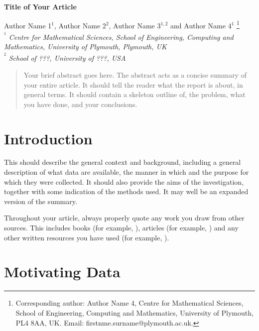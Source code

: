 \documentclass[a4paper,amsmath, 12pt]{article}
\begin{document}
\begin{center}
\textbf{\Large Title of Your Article}

\vspace{0.5cm}

Author Name 1$^{1}$, Author Name 2$^{2}$,  Author Name 3$^{1,2}$ and Author Name 4$^{1}$ \footnote[1]{Corresponding author: Author Name 4, Centre for Mathematical Sciences, School of Engineering, Computing and Mathematics, University of Plymouth, PL4 8AA, UK. Email: firstnme.surname@plymouth.ac.uk.} \\

{\it {\textsuperscript{$^{1}$} Centre for Mathematical Sciences,  School of Engineering, Computing and Mathematics, University of Plymouth, Plymouth, UK \\}}
{\it {\textsuperscript{$^{2}$} School of ???, University of ???, USA}}
\end{center}


\begin{abstract}
\noindent
Your brief abstract goes here. The abstract acts as a concise summary of your entire article. It should tell the reader what the report is about, in general terms. It should contain a skeleton
outline of,  the problem, what you have done, and your conclusions.


\end{abstract}


\section{Introduction}
This should describe the general context and background, including a general
description of what data are available, the manner in which and the purpose for
which they were collected.  It should also provide the aims of the investigation,
together with some indication of the methods used. It may well be an expanded
version of the summary.

Throughout your article, always properly quote any work you draw from other sources. This includes books (for example, \cite{james:2013} ), articles (for example, \cite{Seiichiro:2011}) and any other written resources you have used (for example, \cite{ONS}). \\

\section{Motivating Data}
\end{document}
